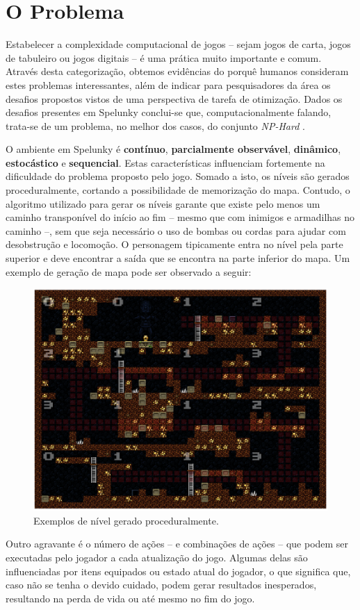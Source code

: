 \chapter{\label{chap:problem}O Problema}
Estabelecer a complexidade computacional de jogos -- sejam jogos de carta,
jogos de tabuleiro ou jogos digitais -- é uma prática muito importante e comum.
Através desta categorização, obtemos evidências do porquê humanos consideram
estes problemas interessantes, além de indicar para pesquisadores da área os
desafios propostos vistos de uma perspectiva de tarefa de otimização.  Dados os
desafios presentes em Spelunky conclui-se que, computacionalmente falando,
trata-se de um problema, no melhor dos casos, do conjunto \textit{NP-Hard}
\cite{SPELUNKYHARD}.

O ambiente em Spelunky é \textbf{contínuo}, \textbf{parcialmente observável},
\textbf{dinâmico}, \textbf{estocástico} e \textbf{sequencial}. Estas
características influenciam fortemente na dificuldade do problema proposto pelo
jogo. Somado a isto, os níveis são gerados proceduralmente, cortando a
possibilidade de memorização do mapa. Contudo, o algoritmo utilizado para gerar
os níveis garante que existe pelo menos um caminho transponível do início ao fim
-- mesmo que com inimigos e armadilhas no caminho --, sem que seja necessário o
uso de bombas ou cordas para ajudar com desobstrução e locomoção. O personagem
tipicamente entra no nível pela parte superior e deve encontrar a saída que se
encontra na parte inferior do mapa. Um exemplo de geração de mapa pode ser
observado a seguir:

\begin{figure}[htb!]
\centering\includegraphics[width=.65\textwidth]{fig/spelunky-level-example.png}
\caption {\label{fig:spelunky-level-example}Exemplos de nível gerado
proceduralmente.} \end{figure}

Outro agravante é o número de ações -- e combinações de ações -- que podem ser
executadas pelo jogador a cada atualização do jogo. Algumas delas são
influenciadas por itens equipados ou estado atual do jogador, o que significa
que, caso não se tenha o devido cuidado, podem gerar resultados inesperados,
resultando na perda de vida ou até mesmo no fim do jogo.

